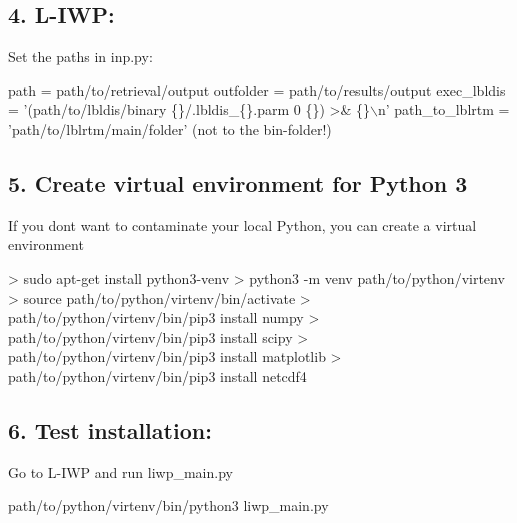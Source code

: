 \subsection*{4. L-\/\+I\+WP\+:}


\begin{DoxyItemize}
\item Set the paths in inp.\+py\+: 
\begin{DoxyCode}
path = path/to/retrieval/output
outfolder = path/to/results/output
exec\_lbldis = '(path/to/lbldis/binary \{\}/.lbldis\_\{\}.parm 0 \{\}) >& \{\}\(\backslash\)n'
path\_to\_lblrtm = 'path/to/lblrtm/main/folder' (not to the bin-folder!)
\end{DoxyCode}

\end{DoxyItemize}

\subsection*{5. Create virtual environment for Python 3}

If you don\textquotesingle{}t want to \textquotesingle{}contaminate\textquotesingle{} your local Python, you can create a virtual environment


\begin{DoxyCode}
> sudo apt-get install python3-venv
> python3 -m venv path/to/python/virtenv
> source path/to/python/virtenv/bin/activate
> path/to/python/virtenv/bin/pip3 install numpy
> path/to/python/virtenv/bin/pip3 install scipy
> path/to/python/virtenv/bin/pip3 install matplotlib
> path/to/python/virtenv/bin/pip3 install netcdf4
\end{DoxyCode}


\subsection*{6. Test installation\+:}


\begin{DoxyItemize}
\item Go to L-\/\+I\+WP and run liwp\+\_\+main.\+py 
\begin{DoxyCode}
path/to/python/virtenv/bin/python3 liwp\_main.py 
\end{DoxyCode}
 
\end{DoxyItemize}